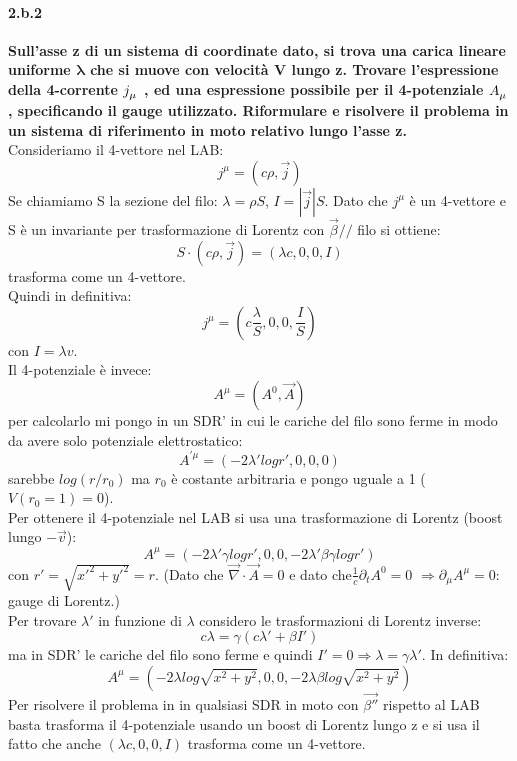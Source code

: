 \documentclass[twoside]{article}
\begin{document}
\paragraph{2.b.2}\textbf{Sull'asse z di un sistema di coordinate dato, si trova una carica lineare uniforme $\mathbf{\lambda}$ che si muove con velocità V lungo z. Trovare l'espressione della 4-corrente $\tensor{j}{_{\mu}}$ ,
ed una espressione possibile per il 4-potenziale $\tensor{A}{_{\mu}}$ , specificando il gauge utilizzato. Riformulare e risolvere il problema in un sistema di riferimento in
moto relativo lungo l'asse z.}\\ 
Consideriamo il 4-vettore nel LAB:
\begin{equation}
    j^{\mu}=(c \rho, \vec{j})
\end{equation}
Se chiamiamo S la sezione del filo: $\lambda=\rho S$, $I=|\vec{j}|S$. Dato che $j^{\mu}$ è un 4-vettore e S è un invariante per trasformazione di Lorentz con $\vec{\beta} // $ filo si ottiene:
\begin{equation}
    S\cdot(c\rho,\vec{j})=(\lambda c, 0, 0 ,I)
\end{equation}
trasforma come un 4-vettore.\\
Quindi in definitiva:
\begin{equation}
    j^{\mu}=\left(c\frac{\lambda}{S}, 0,0,\frac{I}{S}  \right)
\end{equation}
con $I=\lambda v$.\\
Il 4-potenziale è invece:
\begin{equation}
    A^{\mu}=(A^0, \vec{A})
\end{equation}
per calcolarlo mi pongo in un SDR' in cui le cariche del filo sono ferme in modo da avere solo potenziale elettrostatico:
\begin{equation}
    A^{'\mu}=(-2\lambda' log r',0,0,0)
\end{equation}
sarebbe $log(r/r_0)$ ma $r_0$ è costante arbitraria e pongo uguale a 1 ($V(r_0=1)=0$).\\
Per ottenere il 4-potenziale nel LAB si usa una trasformazione di Lorentz (boost lungo $-\vec{v}$):
\begin{equation}
    A^{\mu}=(-2\lambda'\gamma log r',0,0,-2\lambda'\beta\gamma log r')
\end{equation}
con $r'=\sqrt{x'^2+y'^2}=r$. (Dato che $\vec{\nabla} \cdot \vec{A}=0$ e dato che$\frac{1}{c}\partial_tA^0=0$ $\Rightarrow\partial_{\mu}A^{\mu}=0$: gauge di Lorentz.)\\
Per trovare $\lambda'$ in funzione di $\lambda$ considero le trasformazioni di Lorentz inverse:
\begin{equation}
    c \lambda=\gamma(c\lambda'+\beta I')
\end{equation}
ma in SDR' le cariche del filo sono ferme e quindi $I'=0\Rightarrow\lambda=\gamma \lambda'$.
In definitiva:
\begin{equation}
 A^{\mu}=(-2\lambda log\sqrt{x^2+y^2},0,0,-2\lambda \beta log\sqrt{x^2+y^2} )
\end{equation}
Per risolvere il problema in in qualsiasi SDR in moto con $\vec{\beta''}$ rispetto al LAB basta trasforma il 4-potenziale usando un boost di Lorentz lungo z e si usa il fatto che  anche  $(\lambda c,0,0,I)$ trasforma come un 4-vettore.
\end{document}
